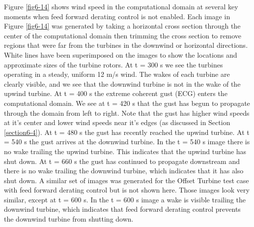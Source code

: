 Figure \ref{fig6-14} shows wind speed in the computational domain at several key moments when feed forward derating control is not enabled. Each image in Figure \ref{fig6-14} was generated by taking a horizontal cross section through the center of the computational domain then trimming the cross section to remove regions that were far from the turbines in the downwind or horizontal directions. White lines have been superimposed on the images to show the locations and approximate sizes of the turbine rotors. At t = 300 s we see the turbines operating in a steady, uniform 12 m/s wind. The wakes of each turbine are clearly visible, and we see that the downwind turbine is not in the wake of the upwind turbine. At t = 400 s the extreme coherent gust (ECG) enters the computational domain. We see at t = 420 s that the gust has begun to propagate through the domain from left to right. Note that the gust has higher wind speeds at it's center and lower wind speeds near it's edges (as discussed in Section \ref{section6-4}). At t = 480 s the gust has recently reached the upwind turbine. At t = 540 s the gust arrives at the downwind turbine. In the t = 540 s image there is no wake trailing the upwind turbine. This indicates that the upwind turbine has shut down. At t = 660 s the gust has continued to propagate downstream and there is no wake trailing the downwind turbine, which indicates that it has also shut down. A similar set of images was generated for the Offset Turbine test case with feed forward derating control but is not shown here. Those images look very similar, except at t = 600 s. In the t = 600 s image a wake is visible trailing the downwind turbine, which indicates that feed forward derating control prevents the downwind turbine from shutting down.

